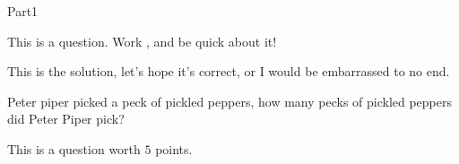 \documentclass[12pt]{article}
\begin{document}
\begin{exam}[Part I.]{Part1}
\ifeqeonline\else
\begin{problem}[3]
This is a question.  Work \OnBackOfPage, and be quick about it!
\begin{solution}[1in]
This is the solution, let's hope it's correct, or I would be
embarrassed to no end.
\end{solution}
%
%
\begin{workarea}[.5\linewidth]{1in}
Peter piper picked a peck of pickled peppers, how many pecks of pickled
peppers did Peter Piper pick?
%
\vfill\hfill\setlength{\fboxsep}{6pt}
\end{workarea}
\end{problem}
\fi

%

\begin{problem}[5]
This is a question worth $5$ points.


\end{problem}
\end{exam}
\end{document}
